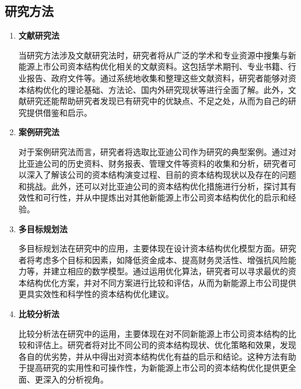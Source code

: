 \subsection{研究方法}
\begin{enumerate}[label=(\arabic*)]
\item \textbf{文献研究法}

当研究方法涉及文献研究法时，研究者将从广泛的学术和专业资源中搜集与新能源上市公司资本结构优化相关的文献资料。这包括学术期刊、专业书籍、行业报告、政府文件等。通过系统地收集和整理这些文献资料，研究者能够对资本结构优化的理论基础、方法论、国内外研究现状等进行全面了解。此外，文献研究还能帮助研究者发现已有研究中的优缺点、不足之处，从而为自己的研究提供借鉴和启示。
\item \textbf{案例研究法}

对于案例研究法而言，研究者将选取比亚迪公司作为研究的典型案例。通过对比亚迪公司的历史资料、财务报表、管理文件等资料的收集和分析，研究者可以深入了解该公司的资本结构演变过程、目前的资本结构现状以及存在的问题和挑战。此外，还可以对比亚迪公司的资本结构优化措施进行分析，探讨其有效性和可行性，并从中提炼出对其他新能源上市公司资本结构优化的启示和经验。
\item \textbf{多目标规划法}

多目标规划法在研究中的应用，主要体现在设计资本结构优化模型方面。研究者将考虑多个目标和因素，如降低资金成本、提高财务灵活性、增强抗风险能力等，并建立相应的数学模型。通过运用优化算法，研究者可以寻求最优的资本结构优化方案，并对不同方案进行比较和评估，从而为新能源上市公司提供更具实效性和科学性的资本结构优化建议。
\item \textbf{比较分析法}

比较分析法在研究中的运用，主要体现在对不同新能源上市公司资本结构的比较和评估上。研究者将对比不同公司的资本结构现状、优化策略和效果，发现各自的优劣势，并从中得出对资本结构优化有益的启示和结论。这种方法有助于提高研究的实用性和可操作性，为新能源上市公司的资本结构优化提供更全面、更深入的分析视角。
\end{enumerate}